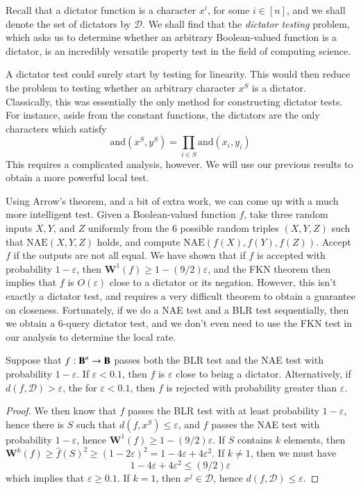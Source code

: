Recall that a dictator function is a character $x^i$, for some $i \in [n]$, and we shall denote the set of dictators by $\mathcal{D}$. We shall find that the \emph{dictator testing} problem, which asks us to determine whether an arbitrary Boolean-valued function is a dictator, is an incredibly versatile property test in the field of computing science.

A dictator test could surely start by testing for linearity. This would then reduce the problem to testing whether an arbitrary character $x^S$ is a dictator. Classically, this was essentially the only method for constructing dictator tests. For instance, aside from the constant functions, the dictators are the only characters which satisfy
%
\[ \text{and}(x^S, y^S) = \prod_{i \in S} \text{and}(x_i,y_i) \]
%
This requires a complicated analysis, however. We will use our previous results to obtain a more powerful local test.

Using Arrow's theorem, and a bit of extra work, we can come up with a much more intelligent test. Given a Boolean-valued function $f$, take three random inputs $X,Y$, and $Z$ uniformly from the 6 possible random triples $(X,Y,Z)$ such that $\text{NAE}(X,Y,Z)$ holds, and compute $\text{NAE}(f(X),f(Y),f(Z))$. Accept $f$ if the outputs are not all equal. We have shown that if $f$ is accepted with probability $1 - \varepsilon$, then $\mathbf{W}^1(f) \geq 1 - (9/2) \varepsilon$, and the FKN theorem then implies that $f$ is $O(\varepsilon)$ close to a dictator or its negation. However, this isn't exactly a dictator test, and requires a very difficult theorem to obtain a guarantee on closeness. Fortunately, if we do a NAE test and a BLR test sequentially, then we obtain a 6-query dictator test, and we don't even need to use the FKN test in our analysis to determine the local rate.

\begin{theorem}
    Suppose that $f: \operatorname{\mathbf{B}}^n \to \operatorname{\mathbf{B}}$ passes both the BLR test and the NAE test with probability $1 - \varepsilon$. If $\varepsilon < 0.1$, then $f$ is $\varepsilon$ close to being a dictator. Alternatively, if $d(f,\mathcal{D}) > \varepsilon$, the for $\varepsilon < 0.1$, then $f$ is rejected with probability greater than $\varepsilon$.
\end{theorem}
\begin{proof}
    We then know that $f$ passes the BLR test with at least probability $1 - \varepsilon$, hence there is $S$ such that $d(f,x^S) \leq \varepsilon$, and $f$ passes the NAE test with probability $1 - \varepsilon$, hence $\mathbf{W}^1(f) \geq 1 - (9/2) \varepsilon$. If $S$ contains $k$ elements, then $\mathbf{W}^k(f) \geq \widehat{f}(S)^2 \geq (1 - 2\varepsilon)^2 = 1 - 4\varepsilon + 4\varepsilon^2$. If $k \neq 1$, then we must have
    \[ 1 - 4 \varepsilon + 4 \varepsilon^2 \leq (9/2) \varepsilon \]
    which implies that $\varepsilon \geq 0.1$. If $k = 1$, then $x^j \in \mathcal{D}$, hence $d(f,\mathcal{D}) \leq \varepsilon$.
\end{proof}

